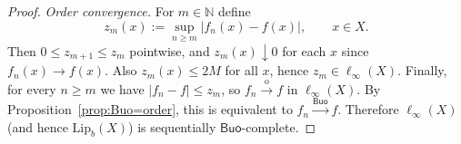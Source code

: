 \documentclass[10pt,a4paper]{amsart}
\newcommand{\Buo}{\ensuremath{\mathsf{Buo}}}
\newcommand{\N}{\mathbb{N}}
\renewcommand{\ge}{\geqslant}
\renewcommand{\le}{\leqslant}
\begin{document}
\begin{proof}
\smallskip\noindent
\emph{Order convergence.}
For $m\in\N$ define
\[
z_m(x):=\sup_{n\ge m}|f_n(x)-f(x)|,\qquad x\in X.
\]
Then $0\le z_{m+1}\le z_m$ pointwise, and $z_m(x)\downarrow0$ for each $x$ since $f_n(x)\to f(x)$.
Also $z_m(x)\le 2M$ for all $x$, hence $z_m\in\ell_\infty(X)$.
Finally, for every $n\ge m$ we have $|f_n-f|\le z_m$, so $f_n\xrightarrow{\mathrm{o}}f$ in $\ell_\infty(X)$.
By Proposition~\ref{prop:Buo=order}, this is equivalent to $f_n\xrightarrow{\Buo}f$.
Therefore $\ell_\infty(X)$ (and hence $\mathrm{Lip}_b(X)$) is sequentially \Buo-complete.
\end{proof}
\end{document}
